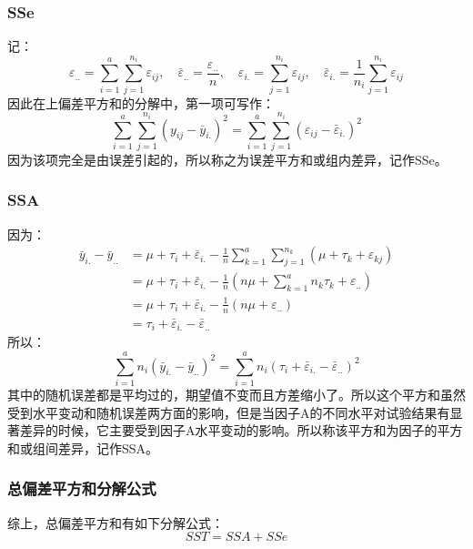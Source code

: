 \subsubsection{SSe}
记：
\begin{equation*}
	\varepsilon_{..}=\sum_{i=1}^a\sum_{j=1}^{n_i}\varepsilon_{ij},\quad\bar{\varepsilon}_{..}=\frac{\varepsilon_{..}}{n},\quad\varepsilon_{i.}=\sum_{j=1}^{n_i}\varepsilon_{ij},\quad\bar{\varepsilon}_{i.}=\frac{1}{n_i}\sum_{j=1}^{n_i}\varepsilon_{ij}
\end{equation*}
因此在上偏差平方和的分解中，第一项可写作：
\begin{equation*}
	\sum_{i=1}^a\sum_{j=1}^{n_i}(y_{ij}-\bar{y}_{i.})^2=\sum_{i=1}^a\sum_{j=1}^{n_i}(\varepsilon_{ij}-\bar{\varepsilon}_{i.})^2
\end{equation*}
因为该项完全是由误差引起的，所以称之为误差平方和或组内差异，记作SSe。\par
\subsubsection{SSA}
因为：
\begin{align*}
	\bar{y}_{i.}-\bar{y}_{..}
	&=\mu+\tau_i+\bar{\varepsilon}_{i.}-\frac{1}{n}\sum_{k=1}^a\sum_{j=1}^{n_k}(\mu+\tau_k+\varepsilon_{kj}) \\
	&=\mu+\tau_i+\bar{\varepsilon}_{i.}-\frac{1}{n}\left(n\mu+\sum_{k=1}^an_k\tau_k+\varepsilon_{..}\right) \\
	&=\mu+\tau_i+\bar{\varepsilon}_{i.}-\frac{1}{n}\left(n\mu+\varepsilon_{..}\right) \\
	&=\tau_i+\bar{\varepsilon}_{i.}-\bar{\varepsilon}_{..}
\end{align*}
所以：
\begin{equation*}
	\sum_{i=1}^an_i(\bar{y}_{i.}-\bar{y}_{..})^2=\sum_{i=1}^an_i(\tau_i+\bar{\varepsilon}_{i.}-\bar{\varepsilon}_{..})^2
\end{equation*}
其中的随机误差都是平均过的，期望值不变而且方差缩小了。所以这个平方和虽然受到水平变动和随机误差两方面的影响，但是当因子A的不同水平对试验结果有显著差异的时候，它主要受到因子A水平变动的影响。所以称该平方和为因子的平方和或组间差异，记作SSA。\par
\subsubsection{总偏差平方和分解公式}
综上，总偏差平方和有如下分解公式：
\begin{equation*}
	SST=SSA+SSe
\end{equation*}

